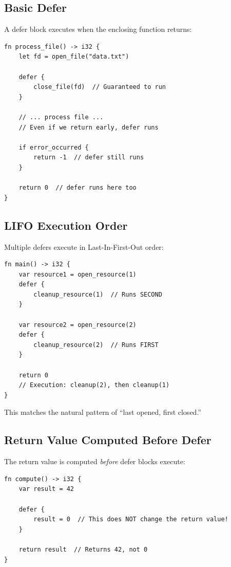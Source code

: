 \subsection{Basic Defer}

A defer block executes when the enclosing function returns:

\begin{lstlisting}
fn process_file() -> i32 {
    let fd = open_file("data.txt")

    defer {
        close_file(fd)  // Guaranteed to run
    }

    // ... process file ...
    // Even if we return early, defer runs

    if error_occurred {
        return -1  // defer still runs
    }

    return 0  // defer runs here too
}
\end{lstlisting}

\subsection{LIFO Execution Order}

Multiple defers execute in Last-In-First-Out order:

\begin{lstlisting}
fn main() -> i32 {
    var resource1 = open_resource(1)
    defer {
        cleanup_resource(1)  // Runs SECOND
    }

    var resource2 = open_resource(2)
    defer {
        cleanup_resource(2)  // Runs FIRST
    }

    return 0
    // Execution: cleanup(2), then cleanup(1)
}
\end{lstlisting}

This matches the natural pattern of ``last opened, first closed.''

\subsection{Return Value Computed Before Defer}

The return value is computed \textit{before} defer blocks execute:

\begin{lstlisting}
fn compute() -> i32 {
    var result = 42

    defer {
        result = 0  // This does NOT change the return value!
    }

    return result  // Returns 42, not 0
}
\end{lstlisting}

